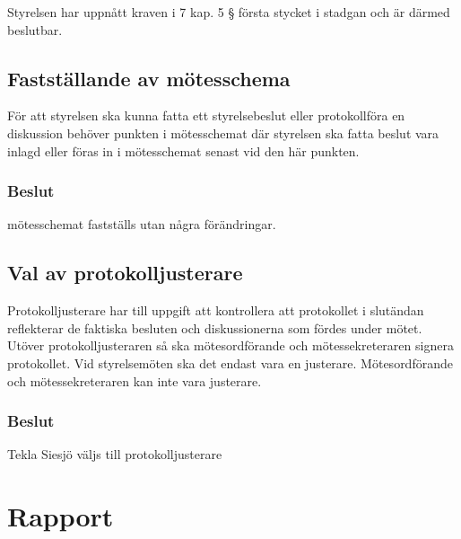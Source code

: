 \documentclass[protokoll]{dvd}
\begin{document}
\begin{attsatser}
    \item Styrelsen har uppnått kraven i 7 kap. 5 § första stycket i stadgan och är därmed beslutbar.
\end{attsatser}

\subsection{Fastställande av mötesschema}

För att styrelsen ska kunna fatta ett styrelsebeslut eller protokollföra en diskussion behöver punkten i mötesschemat där styrelsen ska fatta beslut vara inlagd eller föras in i mötesschemat senast vid den här punkten.

\subsubsection{Beslut}

\begin{attsatser}
    \item mötesschemat fastställs utan några förändringar.
\end{attsatser}

\subsection{Val av protokolljusterare}

Protokolljusterare har till uppgift att kontrollera att protokollet i slutändan reflekterar de faktiska besluten och diskussionerna som fördes under mötet.
Utöver protokolljusteraren så ska mötesordförande och mötessekreteraren signera protokollet.
Vid styrelsemöten ska det endast vara en justerare.
Mötesordförande och mötessekreteraren kan inte vara justerare.

\subsubsection{Beslut}
\begin{attsatser}
    \item Tekla Siesjö väljs till protokolljusterare
\end{attsatser}

\newpage

\section{Rapport}
\end{document}
